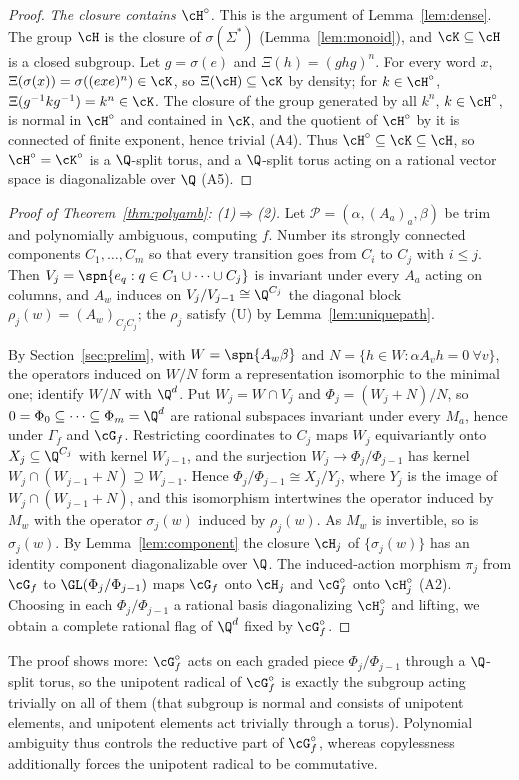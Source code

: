 \begin{proof}
\emph{The closure contains $\cH^\circ$.} This is the argument of Lemma~\ref{lem:dense}. The group $\cH$ is
the closure of $\sigma(\Sigma^*)$ (Lemma~\ref{lem:monoid}), and $\cK\subseteq\cH$ is a closed subgroup.
Let $g=\sigma(e)$ and $\Xi(h)=(ghg)^n$. For every word $x$, $\Xi(\sigma(x))=\sigma((exe)^n)\in\cK$,
so $\Xi(\cH)\subseteq\cK$ by density; for $k\in\cH^\circ$, $\Xi(g^{-1}kg^{-1})=k^n\in\cK$. The closure
of the group generated by all $k^n$, $k\in\cH^\circ$, is normal in $\cH^\circ$ and contained in $\cK$,
and the quotient of $\cH^\circ$ by it is connected of finite exponent, hence trivial (A4). Thus
$\cH^\circ\subseteq\cK\subseteq\cH$, so $\cH^\circ=\cK^\circ$ is a $\Q$-split torus, and a $\Q$-split torus
acting on a rational vector space is diagonalizable over $\Q$ (A5).
\end{proof}

\begin{proof}[Proof of Theorem~\ref{thm:polyamb}: (1)$\Rightarrow$(2)]
Let $\mathcal P=(\alpha,(A_a)_a,\beta)$ be trim and polynomially ambiguous, computing $f$. Number its
strongly connected components $C_1,\ldots,C_m$ so that every transition goes from $C_i$ to $C_j$ with
$i\le j$. Then $V_j=\spn\{e_q:q\in C_1\cup\cdots\cup C_j\}$ is invariant under every $A_a$ acting on
columns, and $A_w$ induces on $V_j/V_{j-1}\cong\Q^{C_j}$ the diagonal block
$\rho_j(w)=(A_w)_{C_jC_j}$; the $\rho_j$ satisfy (U) by Lemma~\ref{lem:uniquepath}.

By Section~\ref{sec:prelim}, with $W=\spn\{A_w\beta\}$ and $N=\{h\in W:\alpha A_vh=0\ \forall v\}$, the
operators induced on $W/N$ form a representation isomorphic to the minimal one; identify $W/N$ with
$\Q^d$. Put $W_j=W\cap V_j$ and $\Phi_j=(W_j+N)/N$, so $0=\Phi_0\subseteq\cdots\subseteq \Phi_m=\Q^d$ are
rational subspaces invariant under every $M_a$, hence under $\Gamma_f$ and $\cG_f$. Restricting
coordinates to $C_j$ maps $W_j$ equivariantly onto $X_j\subseteq\Q^{C_j}$ with kernel $W_{j-1}$, and
the surjection $W_j\to \Phi_j/\Phi_{j-1}$ has kernel $W_j\cap(W_{j-1}+N)\supseteq W_{j-1}$. Hence
$\Phi_j/\Phi_{j-1}\cong X_j/Y_j$, where $Y_j$ is the image of $W_j\cap(W_{j-1}+N)$, and this isomorphism
intertwines the operator induced by $M_w$ with the operator $\sigma_j(w)$ induced by $\rho_j(w)$. As
$M_w$ is invertible, so is $\sigma_j(w)$. By Lemma~\ref{lem:component} the closure $\cH_j$ of
$\{\sigma_j(w)\}$ has an identity component diagonalizable over $\Q$. The induced-action morphism
$\pi_j$ from $\cG_f$ to $\GL(\Phi_j/\Phi_{j-1})$ maps $\cG_f$ onto $\cH_j$ and $\cG_f^\circ$ onto $\cH_j^\circ$
(A2). Choosing in each $\Phi_j/\Phi_{j-1}$ a rational basis diagonalizing $\cH_j^\circ$ and lifting, we obtain
a complete rational flag of $\Q^d$ fixed by $\cG_f^\circ$.
\end{proof}

The proof shows more: $\cG_f^\circ$ acts on each graded piece $\Phi_j/\Phi_{j-1}$ through a $\Q$-split torus,
so the unipotent radical of $\cG_f^\circ$ is exactly the subgroup acting trivially on all of them
(that subgroup is normal and consists of unipotent elements, and unipotent elements act trivially
through a torus).
Polynomial ambiguity thus controls the reductive part of $\cG_f^\circ$, whereas copylessness
additionally forces the unipotent radical to be commutative.
